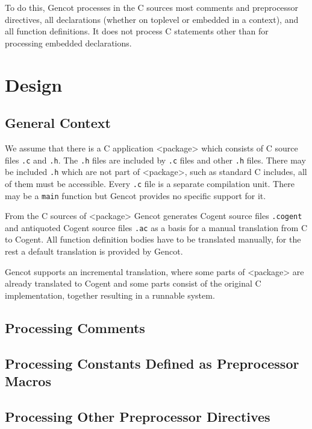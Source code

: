 \documentclass[a4paper]{report}
\newcommand{\code}[1]{\textnormal{\texttt{#1}}}
\begin{document}
To do this, Gencot processes in the C sources most comments and preprocessor directives, all declarations (whether
on toplevel or embedded in a context), and all function definitions. It does not process C statements other than
for processing embedded declarations.

\chapter{Design}

\section{General Context}

We assume that there is a C application <package> which consists of C source files \code{.c} and \code{.h}. The 
\code{.h} files are included by \code{.c} files and other \code{.h} files. There may be included \code{.h} which
are not part of <package>, such as standard C includes, all of them must be accessible. Every \code{.c} file
is a separate compilation unit. There may be a \code{main} function but Gencot provides no specific support for it.

From the C sources of <package> Gencot generates Cogent source files \code{.cogent} and antiquoted Cogent source
files \code{.ac} as a basis for a manual translation from C to Cogent. All function definition bodies have to be
translated manually, for the rest a default translation is provided by Gencot.

Gencot supports an incremental translation, where some parts of <package> are already translated to Cogent and
some parts consist of the original C implementation, together resulting in a runnable system.





\section{Processing Comments}
\label{design-comments}


\section{Processing Constants Defined as Preprocessor Macros}
\label{design-const}


\section{Processing Other Preprocessor Directives}
\label{design-preprocessor}

\end{document}
